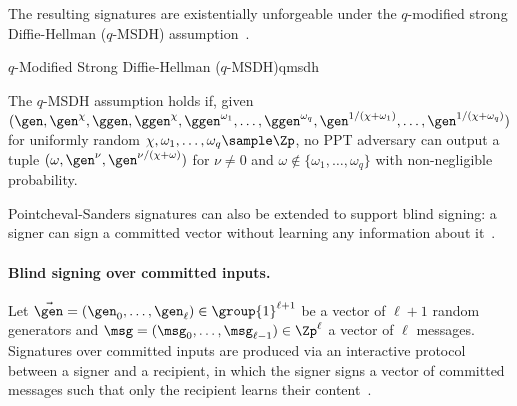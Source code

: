 The resulting signatures are existentially unforgeable under the $q$-modified
strong Diffie-Hellman ($q$-MSDH) assumption~\cite{RSA:PoiSan18}.

\begin{assumptionbox}{$q$-Modified Strong Diffie-Hellman ($q$-MSDH)}{qmsdh}

  The $q$-MSDH assumption holds if, given $(\gen, \gen^{\chi}, \ggen,
  \ggen^{\chi}, \ggen^{\omega_1}, \ldots, \ggen^{\omega_q},
  \gen^{1/(\chi+\omega_1)}, \ldots, \gen^{1/(\chi+\omega_q)})$ for uniformly
  random $\chi, \omega_1, \ldots, \omega_q \sample \Zp$, no PPT adversary can
  output a tuple $(\omega, \gen^\nu, \gen^{\nu/(\chi+\omega)})$ for $\nu \neq
  0$ and $\omega \notin \{\omega_1, \ldots, \omega_q\}$ with non-negligible
  probability.

\end{assumptionbox}

Pointcheval-Sanders signatures can also be extended to support blind signing: a
signer can sign a committed vector without learning any information about
it~\cite{NDSS:SABMD19}.

\paragraph{Blind signing over committed inputs.}\label{sec:blindsig} Let
$\vec{\gen} = (\gen_0, \ldots, \gen_\ell) \in \group{1}^{\ell+1}$ be a vector
of $\ell+1$ random generators and $\msg = (\msg_0, \ldots, \msg_{\ell-1}) \in
\Zp^\ell$ a vector of $\ell$ messages. Signatures over committed inputs are
produced via an interactive protocol between a signer and a recipient, in which
the signer signs a vector of committed messages such that only the recipient
learns their content~\cite{SCN:CamLys02,ASIACCS:LMPY16}.

